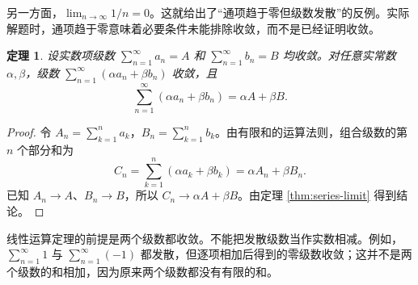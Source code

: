 \documentclass[UTF8,fontset=fandol,11pt]{ctexart}
\newtheorem{theorem}[definition]{定理}
\begin{document}
另一方面，$\lim_{n\to\infty}1/n=0$。这就给出了“通项趋于零但级数发散”的反例。实际解题时，通项趋于零意味着必要条件未能排除收敛，而不是已经证明收敛。\par
\begin{theorem}
\label{thm:linearity}设实数项级数 $\sum_{n=1}^{\infty}a_n=A$ 和 $\sum_{n=1}^{\infty}b_n=B$ 均收敛。对任意实常数 $\alpha,\beta$，级数 $\sum_{n=1}^{\infty}(\alpha a_n+\beta b_n)$ 收敛，且
\[
\sum_{n=1}^{\infty}(\alpha a_n+\beta b_n)=\alpha A+\beta B.
\]
\end{theorem}
\begin{proof}
令 $A_n=\sum_{k=1}^{n}a_k$，$B_n=\sum_{k=1}^{n}b_k$。由有限和的运算法则，组合级数的第 $n$ 个部分和为
\[
C_n=\sum_{k=1}^{n}(\alpha a_k+\beta b_k)=\alpha A_n+\beta B_n.
\]
已知 $A_n\to A$、$B_n\to B$，所以 $C_n\to\alpha A+\beta B$。由定理 \ref{thm:series-limit} 得到结论。
\end{proof}
线性运算定理的前提是两个级数都收敛。不能把发散级数当作实数相减。例如，$\sum_{n=1}^{\infty}1$ 与 $\sum_{n=1}^{\infty}(-1)$ 都发散，但逐项相加后得到的零级数收敛；这并不是两个级数的和相加，因为原来两个级数都没有有限的和。
\end{document}
